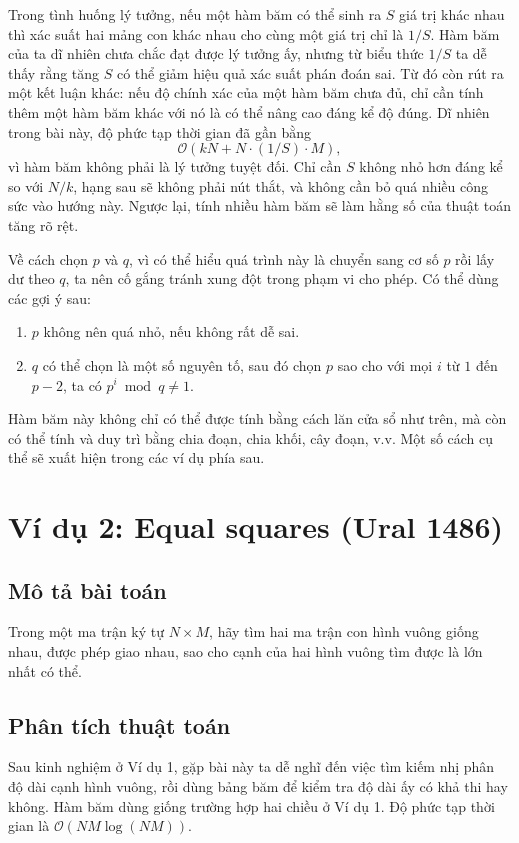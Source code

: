 \documentclass[11pt]{article}
\newcommand{\Oh}{\mathcal{O}}
\begin{document}
Trong tình huống lý tưởng, nếu một hàm băm có thể sinh ra $S$ giá trị khác
nhau thì xác suất hai mảng con khác nhau cho cùng một giá trị chỉ là $1/S$.
Hàm băm của ta dĩ nhiên chưa chắc đạt được lý tưởng ấy, nhưng từ biểu thức
$1/S$ ta dễ thấy rằng tăng $S$ có thể giảm hiệu quả xác suất phán đoán sai.
Từ đó còn rút ra một kết luận khác: nếu độ chính xác của một hàm băm chưa đủ,
chỉ cần tính thêm một hàm băm khác với nó là có thể nâng cao đáng kể độ đúng.
Dĩ nhiên trong bài này, độ phức tạp thời gian đã gần bằng
\[
  \Oh(kN+N\cdot (1/S)\cdot M),
\]
vì hàm băm không phải là lý tưởng tuyệt đối. Chỉ cần $S$ không nhỏ hơn đáng
kể so với $N/k$, hạng sau sẽ không phải nút thắt, và không cần bỏ quá nhiều
công sức vào hướng này. Ngược lại, tính nhiều hàm băm sẽ làm hằng số của
thuật toán tăng rõ rệt.

Về cách chọn $p$ và $q$, vì có thể hiểu quá trình này là chuyển sang cơ số
$p$ rồi lấy dư theo $q$, ta nên cố gắng tránh xung đột trong phạm vi cho
phép. Có thể dùng các gợi ý sau:
\begin{enumerate}
  \item $p$ không nên quá nhỏ, nếu không rất dễ sai.
  \item $q$ có thể chọn là một số nguyên tố, sau đó chọn $p$ sao cho với mọi
  $i$ từ $1$ đến $p-2$, ta có $p^i\bmod q\ne 1$.
\end{enumerate}

Hàm băm này không chỉ có thể được tính bằng cách lăn cửa sổ như trên, mà còn
có thể tính và duy trì bằng chia đoạn, chia khối, cây đoạn, v.v. Một số cách
cụ thể sẽ xuất hiện trong các ví dụ phía sau.

\section{Ví dụ 2: Equal squares (Ural 1486)}

\subsection{Mô tả bài toán}

Trong một ma trận ký tự $N\times M$, hãy tìm hai ma trận con hình vuông giống
nhau, được phép giao nhau, sao cho cạnh của hai hình vuông tìm được là lớn
nhất có thể.

\subsection{Phân tích thuật toán}

Sau kinh nghiệm ở Ví dụ 1, gặp bài này ta dễ nghĩ đến việc tìm kiếm nhị phân
độ dài cạnh hình vuông, rồi dùng bảng băm để kiểm tra độ dài ấy có khả thi
hay không. Hàm băm dùng giống trường hợp hai chiều ở Ví dụ 1. Độ phức tạp
thời gian là $\Oh(NM\log(NM))$.
\end{document}
